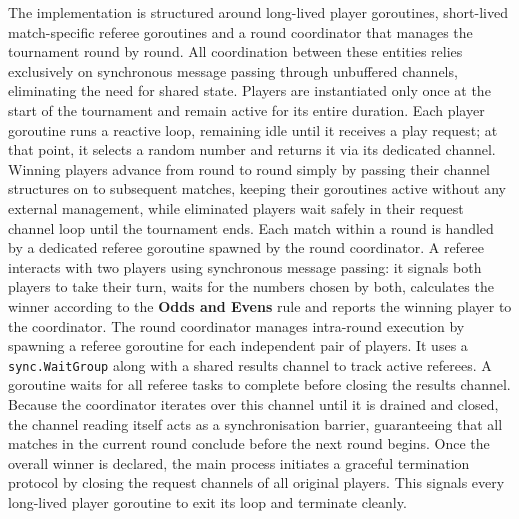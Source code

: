 \documentclass[11pt,a4paper]{article}
\begin{document}
The implementation is structured around long-lived player goroutines, short-lived match-specific referee goroutines and a round coordinator that manages the tournament round by round. All coordination between these entities relies exclusively on synchronous message passing through unbuffered channels, eliminating the need for shared state. Players are instantiated only once at the start of the tournament and remain active for its entire duration. Each player goroutine runs a reactive loop, remaining idle until it receives a play request; at that point, it selects a random number and returns it via its dedicated channel. Winning players advance from round to round simply by passing their channel structures on to subsequent matches, keeping their goroutines active without any external management, while eliminated players wait safely in their request channel loop until the tournament ends. Each match within a round is handled by a dedicated referee goroutine spawned by the round coordinator. A referee interacts with two players using synchronous message passing: it signals both players to take their turn, waits for the numbers chosen by both, calculates the winner according to the \textbf{Odds and Evens} rule and reports the winning player to the coordinator. The round coordinator manages intra-round execution by spawning a referee goroutine for each independent pair of players. It uses a \texttt{sync.WaitGroup} along with a shared results channel to track active referees. A goroutine waits for all referee tasks to complete before closing the results channel. Because the coordinator iterates over this channel until it is drained and closed, the channel reading itself acts as a synchronisation barrier, guaranteeing that all matches in the current round conclude before the next round begins. Once the overall winner is declared, the main process initiates a graceful termination protocol by closing the request channels of all original players. This signals every long-lived player goroutine to exit its loop and terminate cleanly.
\end{document}
